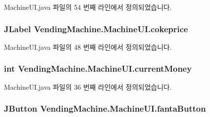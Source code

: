 Machine\+U\+I.\+java 파일의 54 번째 라인에서 정의되었습니다.

\subsubsection[{\texorpdfstring{cokeprice}{cokeprice}}]{\setlength{\rightskip}{0pt plus 5cm}J\+Label Vending\+Machine.\+Machine\+U\+I.\+cokeprice\hspace{0.3cm}{\ttfamily [private]}}\hypertarget{class_vending_machine_1_1_machine_u_i_ae1d7f596ae4cbfd2803924f4a63a9c70}{}\label{class_vending_machine_1_1_machine_u_i_ae1d7f596ae4cbfd2803924f4a63a9c70}


Machine\+U\+I.\+java 파일의 48 번째 라인에서 정의되었습니다.

\subsubsection[{\texorpdfstring{current\+Money}{currentMoney}}]{\setlength{\rightskip}{0pt plus 5cm}int Vending\+Machine.\+Machine\+U\+I.\+current\+Money\hspace{0.3cm}{\ttfamily [private]}}\hypertarget{class_vending_machine_1_1_machine_u_i_ab9b12975e6462529e3abda75e7ebf272}{}\label{class_vending_machine_1_1_machine_u_i_ab9b12975e6462529e3abda75e7ebf272}


Machine\+U\+I.\+java 파일의 36 번째 라인에서 정의되었습니다.

\subsubsection[{\texorpdfstring{fanta\+Button}{fantaButton}}]{\setlength{\rightskip}{0pt plus 5cm}J\+Button Vending\+Machine.\+Machine\+U\+I.\+fanta\+Button\hspace{0.3cm}{\ttfamily [private]}}\hypertarget{class_vending_machine_1_1_machine_u_i_a93b9aa7f2c2b9869072c6f47e33466bc}{}\label{class_vending_machine_1_1_machine_u_i_a93b9aa7f2c2b9869072c6f47e33466bc}


